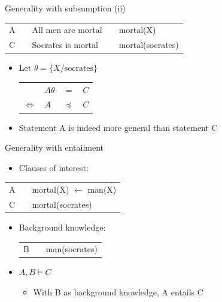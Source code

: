 \begin{frame}{Generality with subsumption (ii)}
\vfill
\begin{center}
\begin{tabular}{lllll}
    A & & All men are mortal & & mortal(X) \\
    C & & Socrates is mortal & & mortal(socrates) \\
\end{tabular}
\end{center}    
\vfill
\begin{itemize}
\item Let $\theta = \{X/\text{socrates}\}$
\begin{center}
\begin{tabular}{llll}
&$A\theta$&$=$&$C$\\
$\Leftrightarrow$&$A$&$\preceq$&$C$
\end{tabular}    
\end{center}
\vfill
    \item[\ding{43}] Statement A is indeed more general than statement C
    \vfill
\end{itemize}
\end{frame}

\begin{frame}{Generality with entailment}
\vfill
\begin{itemize}
    \item Clauses of interest:
\end{itemize}
\vfill
\begin{center}
\begin{tabular}{lll}
    A & & mortal(X) $\leftarrow$ man(X) \\
    C & & mortal(socrates) \\
\end{tabular}
\end{center}    
\vfill
\begin{itemize}
    \item Background knowledge:
    \vfill
        \begin{center}\hspace{-55pt}
        \begin{tabular}{lll}
            B & & man(socrates) \\
        \end{tabular}
        \end{center}    
\vfill
    \item $A, B \models C$
    \vfill
    \begin{itemize}
        \item[\ding{43}] With B as background knowledge, A entails C
    \end{itemize}
\end{itemize}    
\vfill
\end{frame}

